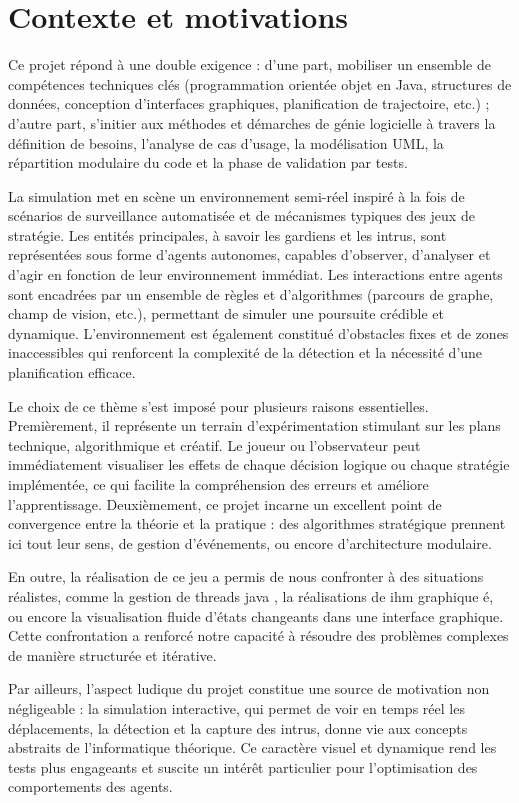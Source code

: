 \newpage
\section{Contexte et motivations}


Ce projet répond à une double exigence : d’une part, mobiliser un ensemble de compétences techniques clés (programmation orientée objet en Java, structures de données, conception d'interfaces graphiques, planification de trajectoire, etc.) ; d’autre part, s’initier aux méthodes et démarches de génie logicielle à travers la définition de besoins, l’analyse de cas d’usage, la modélisation UML, la répartition modulaire du code et la phase de validation par tests.

La simulation met en scène un environnement semi-réel inspiré à la fois de scénarios de surveillance automatisée et de mécanismes typiques des jeux de stratégie. Les entités principales, à savoir les gardiens et les intrus, sont représentées sous forme d’agents autonomes, capables d’observer, d’analyser et d’agir en fonction de leur environnement immédiat. Les interactions entre agents sont encadrées par un ensemble de règles et d’algorithmes (parcours de graphe, champ de vision, etc.), permettant de simuler une poursuite crédible et dynamique. L’environnement est également constitué d’obstacles fixes et de zones inaccessibles qui renforcent la complexité de la détection et la nécessité d’une planification efficace.

Le choix de ce thème s’est imposé pour plusieurs raisons essentielles. Premièrement, il représente un terrain d’expérimentation stimulant sur les plans technique, algorithmique et créatif. Le joueur ou l’observateur peut immédiatement visualiser les effets de chaque décision logique ou chaque stratégie implémentée, ce qui facilite la compréhension des erreurs et améliore l’apprentissage. Deuxièmement, ce projet incarne un excellent point de convergence entre la théorie et la pratique : des algorithmes stratégique  prennent ici tout leur sens, de gestion d’événements, ou encore d’architecture modulaire.

En outre, la réalisation de ce jeu a permis de nous confronter à des situations réalistes, comme la gestion de threads java , la réalisations de ihm graphique é, ou encore la visualisation fluide d’états changeants dans une interface graphique. Cette confrontation a renforcé notre capacité à résoudre des problèmes complexes de manière structurée et itérative.

Par ailleurs, l’aspect ludique du projet constitue une source de motivation non négligeable : la simulation interactive, qui permet de voir en temps réel les déplacements, la détection et la capture des intrus, donne vie aux concepts abstraits de l’informatique théorique. Ce caractère visuel et dynamique rend les tests plus engageants et suscite un intérêt particulier pour l’optimisation des comportements des agents.

